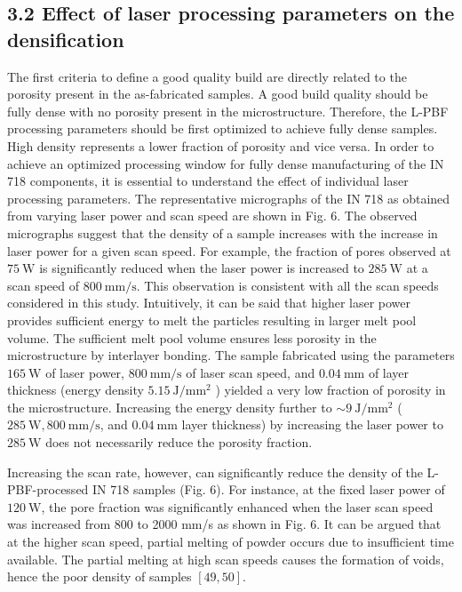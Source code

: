 \documentclass[10pt]{article}
\begin{document}
\subsection*{3.2 Effect of laser processing parameters on the densification}
The first criteria to define a good quality build are directly related to the porosity present in the as-fabricated samples. A good build quality should be fully dense with no porosity present in the microstructure. Therefore, the L-PBF processing parameters should be first optimized to achieve fully dense samples. High density represents a lower fraction of porosity and vice versa. In order to achieve an optimized processing window for fully dense manufacturing of the IN 718 components, it is essential to understand the effect of individual laser processing parameters. The representative micrographs of the IN 718 as obtained from varying laser power and scan speed are shown in Fig. 6. The observed micrographs suggest that the density of a sample increases with the increase in laser power for a given scan speed. For example, the fraction of pores observed at $75 \mathrm{~W}$ is significantly reduced when the laser power is increased to $285 \mathrm{~W}$ at a scan speed of $800 \mathrm{~mm} / \mathrm{s}$. This observation is consistent with all the scan speeds considered in this study. Intuitively, it can be said that higher laser power provides sufficient energy to melt the particles resulting in larger melt pool volume. The sufficient melt pool volume ensures less porosity in the microstructure by interlayer bonding. The sample fabricated using the parameters $165 \mathrm{~W}$ of laser power, $800 \mathrm{~mm} / \mathrm{s}$ of laser scan speed, and $0.04 \mathrm{~mm}$ of layer thickness (energy density $5.15 \mathrm{~J} / \mathrm{mm}^{2}$ ) yielded a very low fraction of porosity in the microstructure. Increasing the energy density further to $\sim 9 \mathrm{~J} / \mathrm{mm}^{2}$ ( $285 \mathrm{~W}, 800 \mathrm{~mm} / \mathrm{s}$, and $0.04 \mathrm{~mm}$ layer thickness) by increasing the laser power to $285 \mathrm{~W}$ does not necessarily reduce the porosity fraction.

Increasing the scan rate, however, can significantly reduce the density of the L-PBF-processed IN 718 samples (Fig. 6). For instance, at the fixed laser power of $120 \mathrm{~W}$, the pore fraction was significantly enhanced when the laser scan speed was increased from 800 to 2000 mm/s as shown in Fig. 6. It can be argued that at the higher scan speed, partial melting of powder occurs due to insufficient time available. The partial melting at high scan speeds causes the formation of voids, hence the poor density of samples $[49,50]$.
\end{document}
